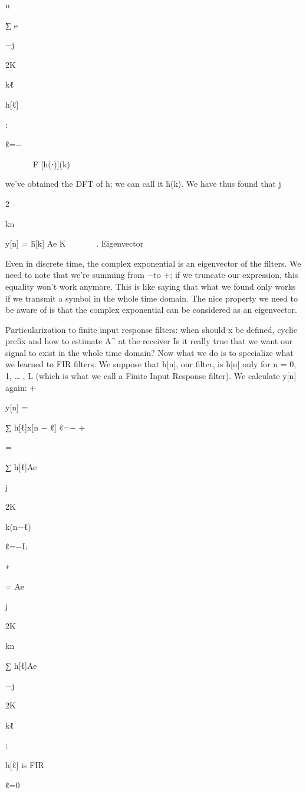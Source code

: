 {n

∑ e

−j

2\pi K

kℓ

h[ℓ]

:

ℓ=−\infty






F [h(⋅)](k)

we've obtained the DFT of h; we can call it h̄(k). We have thus found that j

2\pi

kn

y[n] = h̄[k] Ae K


   .
Eigenvector

Even in discrete time, the complex exponential is an eigenvector of the filters.
We need to note that we're summing from −\infty to +\infty; if we truncate our expression,
this equality won't work anymore. This is like saying that what we found only works if we transmit a symbol in the whole time domain.
The nice property we need to be aware of is that the complex exponential can be considered as an eigenvector.

Particularization to finite input response filters: when should x be defined, cyclic prefix and how to estimate A^ at the receiver Is it really true that we want our signal to exist in the whole time domain?
Now what we do is to specialize what we learned to FIR filters.
We suppose that h[n], our filter, is h[n]  only for n = 0, 1, … , L (which is what we call a Finite Input Response filter).
We calculate y[n] again:
+\infty

y[n] =

∑ h[ℓ]x[n − ℓ]
ℓ=−\infty
+\infty

=

∑ h[ℓ]Ae

j

2\pi K

k(n−ℓ)

ℓ=−\infty L

∗

= Ae

j

2\pi K

kn

∑ h[ℓ]Ae

−j

2\pi K

kℓ

;

h[ℓ] is FIR

ℓ=0

}
